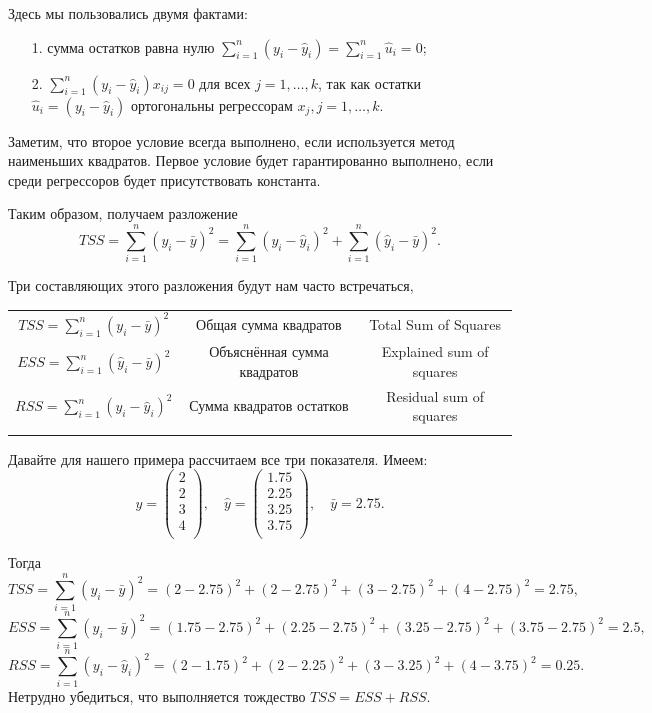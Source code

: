 \documentclass[12pt]{article}
\newcommand{\hu}{\hat{u}}
\newcommand{\hy}{\hat{y}}
\newcommand{\RSS}{RSS}
\newcommand{\ESS}{ESS}
\newcommand{\TSS}{TSS}
\begin{document}
Здесь мы пользовались двумя фактами:
\begin{enumerate}
    \item[1.] сумма остатков равна нулю $\sum_{i=1}^n (y_i - \hat{y}_i) = \sum_{i=1}^n \hu_i = 0$;
    \item[2.] $\sum_{i=1}^n (y_i - \hat{y}_i)x_{ij} = 0$ для всех $j=1,\dots,k$, так как остатки $\hu_i = (y_i - \hy_i)$ ортогональны регрессорам $x_j, j=1,\dots, k$.
\end{enumerate}

Заметим, что второе условие всегда выполнено, если используется метод наименьших квадратов. 
Первое условие будет гарантированно выполнено, если среди регрессоров будет присутствовать константа. 

Таким образом, получаем разложение
\[
\TSS = \sum_{i=1}^n (y_i - \bar{y})^2 = \sum_{i=1}^n (y_i - \hy_i)^2 + \sum_{i=1}^n (\hy_i - \bar{y})^2.
\]

Три составляющих этого разложения будут нам часто встречаться,

    \begin{tabular}{ccc}
    \toprule
        $\TSS = \sum_{i=1}^n (y_i - \bar{y})^2$ & Общая сумма квадратов &  Total Sum of Squares   \\
        $\ESS = \sum_{i=1}^n (\hy_i - \bar{y})^2$ & Объяснённая сумма квадратов & Explained sum of squares  \\
        $\RSS = \sum_{i=1}^n (y_i - \hy_i)^2$ & Сумма квадратов остатков & Residual sum of squares  \\
    \bottomrule
    \label{tab:sum_of_squares}
    \end{tabular}

Давайте для нашего примера рассчитаем все три показателя. Имеем:
\[
y = \begin{pmatrix}
    2 \\
    2 \\
    3 \\
    4 \\
\end{pmatrix}, \quad \hy = \begin{pmatrix}
    1.75 \\
    2.25 \\
    3.25 \\
    3.75 \\
\end{pmatrix}, \quad \bar{y} = 2.75.
\]

Тогда
\[
\TSS = \sum_{i=1}^n (y_i - \bar{y})^2 = (2-2.75)^2 + (2-2.75)^2 + (3-2.75)^2 + (4-2.75)^2 = 2.75,
\]
\[
\ESS = \sum_{i=1}^n (y_i - \bar{y})^2 = (1.75-2.75)^2 + (2.25-2.75)^2 + (3.25-2.75)^2 + (3.75-2.75)^2 = 2.5,
\]
\[
\RSS = \sum_{i=1}^n (y_i - \hy_i)^2 = (2-1.75)^2 + (2-2.25)^2 + (3-3.25)^2 + (4-3.75)^2 = 0.25.
\]
Нетрудно убедиться, что выполняется тождество $\TSS = \ESS + \RSS$.
\end{document}
